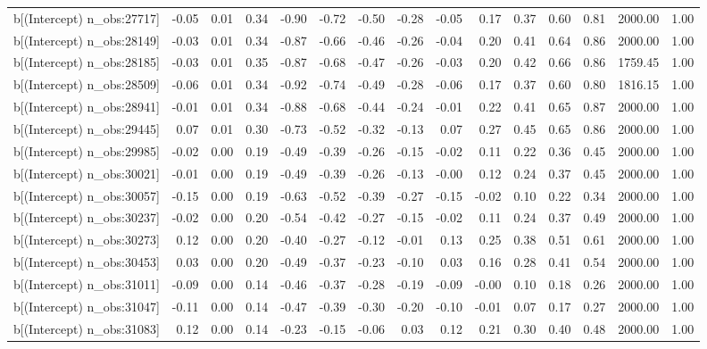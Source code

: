 \begin{table}[ht]
\begin{tabular}{rrrrrrrrrrrrrrr}
  b[(Intercept) n\_obs:27717] & -0.05 & 0.01 & 0.34 & -0.90 & -0.72 & -0.50 & -0.28 & -0.05 & 0.17 & 0.37 & 0.60 & 0.81 & 2000.00 & 1.00 \\ 
  b[(Intercept) n\_obs:28149] & -0.03 & 0.01 & 0.34 & -0.87 & -0.66 & -0.46 & -0.26 & -0.04 & 0.20 & 0.41 & 0.64 & 0.86 & 2000.00 & 1.00 \\ 
  b[(Intercept) n\_obs:28185] & -0.03 & 0.01 & 0.35 & -0.87 & -0.68 & -0.47 & -0.26 & -0.03 & 0.20 & 0.42 & 0.66 & 0.86 & 1759.45 & 1.00 \\ 
  b[(Intercept) n\_obs:28509] & -0.06 & 0.01 & 0.34 & -0.92 & -0.74 & -0.49 & -0.28 & -0.06 & 0.17 & 0.37 & 0.60 & 0.80 & 1816.15 & 1.00 \\ 
  b[(Intercept) n\_obs:28941] & -0.01 & 0.01 & 0.34 & -0.88 & -0.68 & -0.44 & -0.24 & -0.01 & 0.22 & 0.41 & 0.65 & 0.87 & 2000.00 & 1.00 \\ 
  b[(Intercept) n\_obs:29445] & 0.07 & 0.01 & 0.30 & -0.73 & -0.52 & -0.32 & -0.13 & 0.07 & 0.27 & 0.45 & 0.65 & 0.86 & 2000.00 & 1.00 \\ 
  b[(Intercept) n\_obs:29985] & -0.02 & 0.00 & 0.19 & -0.49 & -0.39 & -0.26 & -0.15 & -0.02 & 0.11 & 0.22 & 0.36 & 0.45 & 2000.00 & 1.00 \\ 
  b[(Intercept) n\_obs:30021] & -0.01 & 0.00 & 0.19 & -0.49 & -0.39 & -0.26 & -0.13 & -0.00 & 0.12 & 0.24 & 0.37 & 0.45 & 2000.00 & 1.00 \\ 
  b[(Intercept) n\_obs:30057] & -0.15 & 0.00 & 0.19 & -0.63 & -0.52 & -0.39 & -0.27 & -0.15 & -0.02 & 0.10 & 0.22 & 0.34 & 2000.00 & 1.00 \\ 
  b[(Intercept) n\_obs:30237] & -0.02 & 0.00 & 0.20 & -0.54 & -0.42 & -0.27 & -0.15 & -0.02 & 0.11 & 0.24 & 0.37 & 0.49 & 2000.00 & 1.00 \\ 
  b[(Intercept) n\_obs:30273] & 0.12 & 0.00 & 0.20 & -0.40 & -0.27 & -0.12 & -0.01 & 0.13 & 0.25 & 0.38 & 0.51 & 0.61 & 2000.00 & 1.00 \\ 
  b[(Intercept) n\_obs:30453] & 0.03 & 0.00 & 0.20 & -0.49 & -0.37 & -0.23 & -0.10 & 0.03 & 0.16 & 0.28 & 0.41 & 0.54 & 2000.00 & 1.00 \\ 
  b[(Intercept) n\_obs:31011] & -0.09 & 0.00 & 0.14 & -0.46 & -0.37 & -0.28 & -0.19 & -0.09 & -0.00 & 0.10 & 0.18 & 0.26 & 2000.00 & 1.00 \\ 
  b[(Intercept) n\_obs:31047] & -0.11 & 0.00 & 0.14 & -0.47 & -0.39 & -0.30 & -0.20 & -0.10 & -0.01 & 0.07 & 0.17 & 0.27 & 2000.00 & 1.00 \\ 
  b[(Intercept) n\_obs:31083] & 0.12 & 0.00 & 0.14 & -0.23 & -0.15 & -0.06 & 0.03 & 0.12 & 0.21 & 0.30 & 0.40 & 0.48 & 2000.00 & 1.00 \\ 

\end{tabular}
\end{table}
